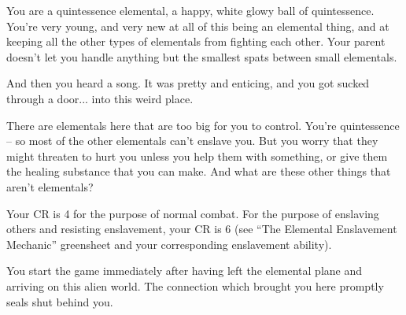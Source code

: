 \documentclass[char]{elementals}
\begin{document}
\name{\cNewQ{}}

You are a quintessence elemental, a happy, white glowy ball of quintessence.  You're very young, and very new at all of this being an elemental thing, and at keeping all the other types of elementals from fighting each other.  Your parent doesn't let you handle anything but the smallest spats between small elementals.

And then you heard a song.  It was pretty and enticing, and you got sucked through a door... into this weird place.

There are elementals here that are too big for you to control.  You're quintessence -- so most of the other elementals can't enslave you.  But you worry that they might threaten to hurt you unless you help them with something, or give them the healing substance \iWhite{} that you can make.  And what are these other things that aren't elementals?

Your CR is 4 for the purpose of normal combat. For the purpose of enslaving others and resisting enslavement, your CR is 6 (see ``The Elemental Enslavement Mechanic'' greensheet and your corresponding enslavement ability).

You start the game immediately after having left the elemental plane and arriving on this alien world. The connection which brought you here promptly seals shut behind you.
\end{document}
